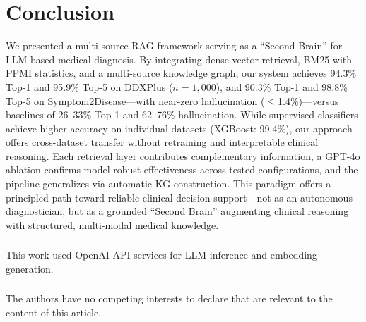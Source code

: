 \documentclass[runningheads]{llncs}
\begin{document}
\section{Conclusion}
\label{sec:conclusion}

We presented a multi-source RAG framework serving as a ``Second Brain'' for LLM-based medical diagnosis. By integrating dense vector retrieval, BM25 with PPMI statistics, and a multi-source knowledge graph, our system achieves 94.3\% Top-1 and 95.9\% Top-5 on DDXPlus ($n{=}1{,}000$), and 90.3\% Top-1 and 98.8\% Top-5 on Symptom2Disease---with near-zero hallucination ($\leq$1.4\%)---versus baselines of 26--33\% Top-1 and 62--76\% hallucination. While supervised classifiers achieve higher accuracy on individual datasets (XGBoost: 99.4\%), our approach offers cross-dataset transfer without retraining and interpretable clinical reasoning. Each retrieval layer contributes complementary information, a GPT-4o ablation confirms model-robust effectiveness across tested configurations, and the pipeline generalizes via automatic KG construction. This paradigm offers a principled path toward reliable clinical decision support---not as an autonomous diagnostician, but as a grounded ``Second Brain'' augmenting clinical reasoning with structured, multi-modal medical knowledge.

\begin{credits}
\subsubsection{\ackname}
This work used OpenAI API services for LLM inference and embedding generation.

\subsubsection{\discintname}
The authors have no competing interests to declare that are relevant to the content of this article.
\end{credits}

\end{document}
